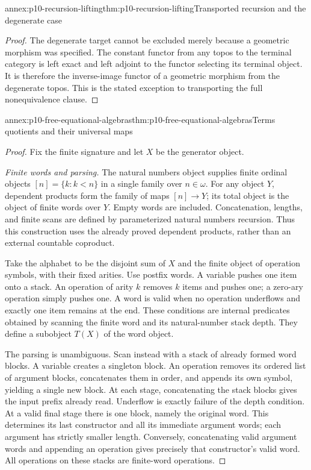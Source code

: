 \begin{annexitem}{annex:p10-recursion-lifting}{thm:p10-recursion-lifting}{Transported recursion and the degenerate case}
\begin{proof}
The degenerate target cannot be excluded merely because a
geometric morphism was specified.
The constant functor from any topos to the terminal category
is left exact and left adjoint to the functor selecting its
terminal object. It is therefore the inverse-image functor
of a geometric morphism from the degenerate topos.
This is the stated exception to transporting the full
nonequivalence clause.
\end{proof}
\end{annexitem}

\begin{annexitem}{annex:p10-free-equational-algebras}{thm:p10-free-equational-algebras}{Terms quotients and their universal maps}
\begin{proof}
Fix the finite signature and let \(X\) be the generator object.

\emph{Finite words and parsing.}
The natural numbers object supplies finite ordinal objects
\([n]=\{k:k<n\}\) in a single family over \(n\in\omega\).
For any object \(Y\), dependent products form the family
of maps \([n]\to Y\); its total object is the object of
finite words over \(Y\). Empty words are included.
Concatenation, lengths, and finite scans are defined by
parameterized natural numbers recursion.
Thus this construction uses the already proved dependent
products, rather than an external countable coproduct.

Take the alphabet to be the disjoint sum of \(X\) and the
finite object of operation symbols, with their fixed arities.
Use postfix words. A variable pushes one item onto a stack.
An operation of arity \(k\) removes \(k\) items and pushes
one; a zero-ary operation simply pushes one.
A word is valid when no operation underflows and exactly
one item remains at the end.
These conditions are internal predicates obtained by scanning
the finite word and its natural-number stack depth.
They define a subobject \(T(X)\) of the word object.

The parsing is unambiguous. Scan instead with a stack of
already formed word blocks. A variable creates a singleton
block. An operation removes its ordered list of argument
blocks, concatenates them in order, and appends its own
symbol, yielding a single new block.
At each stage, concatenating the stack blocks gives the
input prefix already read. Underflow is exactly failure of
the depth condition. At a valid final stage there is one
block, namely the original word.
This determines its last constructor and all its immediate
argument words; each argument has strictly smaller length.
Conversely, concatenating valid argument words and appending
an operation gives precisely that constructor's valid word.
All operations on these stacks are finite-word operations.


\end{proof}
\end{annexitem}
